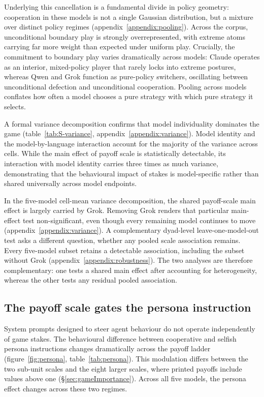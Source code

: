 \documentclass[openacc]{rsproca_new}
\begin{document}
Underlying this cancellation is a fundamental divide in policy geometry:
cooperation in these models is not a single Gaussian distribution, but a mixture
over distinct policy regimes (appendix~\ref{appendix:pooling}). Across the corpus,
unconditional boundary play is strongly overrepresented, with extreme atoms
carrying far more weight than expected under uniform play. Crucially, the commitment to boundary
play varies dramatically across models: Claude operates as an interior,
mixed-policy player that rarely locks into extreme postures, whereas Qwen and
Grok function as pure-policy switchers, oscillating between unconditional
defection and unconditional cooperation. Pooling across models conflates how
often a model chooses a pure strategy with which pure strategy it selects.

A formal variance decomposition confirms that model individuality dominates
the game (table~\ref{tab:S-variance}, appendix~\ref{appendix:variance}). Model
identity and the model-by-language interaction account for the majority of the
variance across cells. While the main effect of payoff scale is statistically
detectable, its interaction with model identity carries three times as much
variance, demonstrating that the behavioural impact of stakes is model-specific
rather than shared universally across model endpoints.

In the five-model cell-mean variance decomposition, the shared payoff-scale
main effect is largely carried by Grok. Removing Grok renders that particular
main-effect test non-significant, even though every remaining model continues
to move (appendix~\ref{appendix:variance}). A complementary dyad-level
leave-one-model-out test asks a different question, whether any pooled scale
association remains. Every five-model subset retains a detectable association,
including the subset without Grok (appendix~\ref{appendix:robustness}). The two
analyses are therefore complementary: one tests a shared main effect after
accounting for heterogeneity, whereas the other tests any residual pooled
association.

\subsection{The payoff scale gates the persona instruction}\label{sec:persona}

System prompts designed to steer agent behaviour do not operate independently of
game stakes. The behavioural difference between cooperative and selfish persona
instructions changes dramatically across the payoff ladder (figure~\ref{fig:persona},
table~\ref{tab:persona}). This modulation differs between the two sub-unit
scales and the eight larger scales, where printed payoffs include values above
one (\S\ref{sec:gameImportance}). Across all five models, the persona effect
changes across these two regimes.
\end{document}
